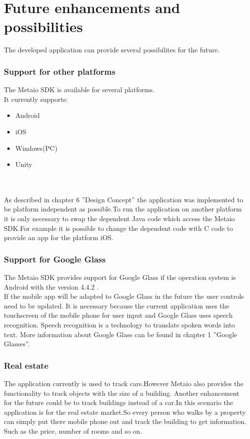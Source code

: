 \chapter{Future enhancements and possibilities} \label{chapter:Future enhancement and possibilities}

The developed application can provide several possibilites for the future.
\subsection{Support for other platforms}
The Metaio SDK is available for several platforms.  \\It currently supports:
\begin{itemize}
\item Android
\item iOS
\item Windows(PC)
\item Unity
\end{itemize}
 \cite{metaioPlatforms} 
        \\
        \\
As described in chapter 6 ''Design Concept'' the application was implemented to be platform independent as possible.To run the application on another platform it is only necessary to swap the dependent Java code which access the Metaio SDK.For example it is possible to change the dependent code with C code to provide an app for the platform iOS. 


\newpage
\subsection{Support for Google Glass}
The Metaio SDK provides support for Google Glass if the operation system is Android with the version 4.4.2 .\cite{metaioGlass}\\
If the mobile app will be adapted to Google Glass in the future the user controls need to be updated. It is necessary because the current application  uses the touchscreen of the mobile phone  for user input and Google Glass uses speech recognition. Speech recognition is a technology to translate spoken words into text.    
More information about Google Glass can be found in  chapter 1 ''Google Glasses''.   
\subsection{Real estate}
The application currently is used to track cars.However Metaio also provides the functionality to track objects with the size of a building. Another enhancement for the future could be to track buildings instead of a car.In this scenario the application is for the real estate market.So every person who walks by a property can simply put there mobile phone out and track the building to get information. Such as the price, number of rooms and so on.    
